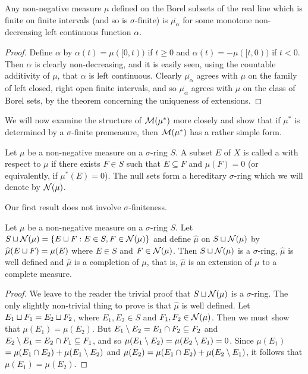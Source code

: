 \begin{corollary}
Any non-negative measure $\mu$ defined on the Borel subsets of the real line which is finite on finite intervals (and so is $\sigma$-finite) is $\overline{\mu_\alpha}$ for some monotone non-decreasing left continuous function $\alpha$.
\end{corollary}

\begin{proof}
Define $\alpha$ by $\alpha(t)=\mu([0, t))$ if $t \geq 0$ and $\alpha(t)=-\mu([t, 0))$ if $t<0$. Then $\alpha$ is clearly non-decreasing, and it is easily seen, using the countable additivity of $\mu$, that $\alpha$ is left continuous. Clearly $\overline{\mu_\alpha}$ agrees with $\mu$ on the family of left closed, right open finite intervals, and so $\overline{\mu_\alpha}$ agrees with $\mu$ on the class of Borel sets, by the theorem concerning the uniqueness of extensions.
\end{proof}

We will now examine the structure of ${\cal M}(\mu^*)$ more closely and show that if $\mu^*$ is determined by a $\sigma$-finite premeasure, then ${\cal M}(\mu^*)$ has a rather simple form.

\begin{definition}
Let $\mu$ be a non-negative measure on a $\sigma$-ring $S$. A subset $E$ of $X$ is called a  with respect to $\mu$ if there exists $F \in S$ such that $E \subseteq F$ and $\mu(F)=0$ (or equivalently, if $\mu^*(E)=0$). The null sets form a hereditary $\sigma$-ring which we will denote by ${\cal N}(\mu)$.
\end{definition}

Our first result does not involve $\sigma$-finiteness.

\begin{proposition}\label{prop:null set completion}
Let $\mu$ be a non-negative measure on a $\sigma$-ring $S$. Let $S\sqcup{\cal N}(\mu)=\{E\sqcup F:E\in S,F\in {\cal N}(\mu)\}$ and define $\widehat{\mu}$ on $S \sqcup {\cal N}(\mu)$ by $\widehat{\mu}(E \sqcup F)=\mu(E)$ where $E \in S$ and $F \in {\cal N}(\mu)$. Then $S \sqcup {\cal N}(\mu)$ is a $\sigma$-ring, $\widehat{\mu}$ is well defined and $\widehat{\mu}$ is a completion of $\mu$, that is, $\widehat{\mu}$ is an extension of $\mu$ to a complete measure.
\end{proposition}

\begin{proof}
We leave to the reader the trivial proof that $S\sqcup {\cal N}(\mu)$ is a $\sigma$-ring. The only slightly non-trivial thing to prove is that $\widehat{\mu}$ is well defined. Let $E_1 \sqcup F_1=E_2 \sqcup F_2$, where $E_1, E_2 \in S$ and $F_1, F_2 \in {\cal N}(\mu)$. Then we must show that $\mu(E_1)=\mu(E_2)$. But $E_1\setminus E_2=E_1 \cap F_2 \subseteq F_2$ and $E_2\setminus E_1=E_2 \cap F_1 \subseteq F_1$, and so $\mu(E_1\setminus E_2)=\mu(E_2\setminus E_1)=0$. Since $\mu(E_1)$ $=\mu(E_1 \cap E_2)+\mu(E_1\setminus E_2)$ and $\mu(E_2)=\mu(E_1 \cap E_2)+\mu(E_2\setminus E_1)$, it follows that $\mu(E_1)=\mu(E_2)$.

\end{proof}

